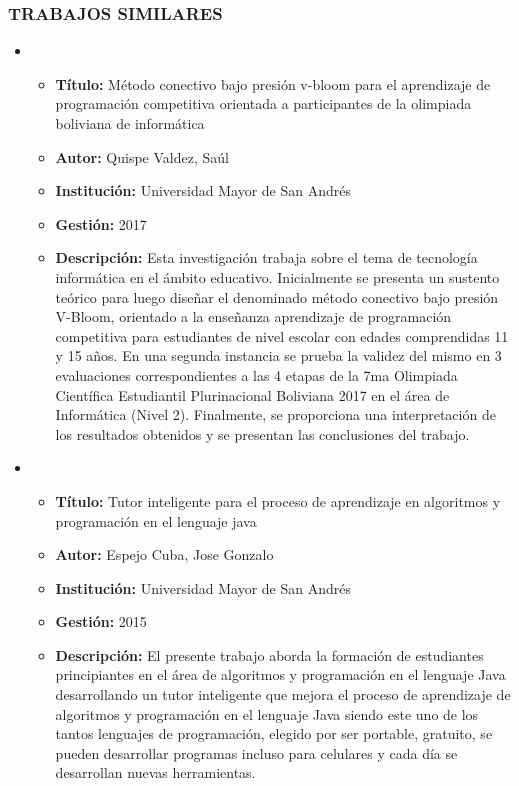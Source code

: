 \subsubsection{TRABAJOS SIMILARES}

\begin{itemize}
    \item [\textbullet]
    \begin{itemize}[nosep]
        \item[] \textbf{Título:} Método conectivo bajo presión v-bloom para el aprendizaje de programación competitiva orientada a participantes de la olimpiada boliviana de informática 
        \item[] \textbf{Autor:} Quispe Valdez, Saúl
        \item[] \textbf{Institución:} Universidad Mayor de San Andrés
        \item[] \textbf{Gestión:} 2017
        \item[] \textbf{Descripción:} Esta investigación trabaja sobre el tema de tecnología informática en el ámbito educativo. Inicialmente se presenta un sustento teórico para luego diseñar el denominado método conectivo bajo presión V-Bloom, orientado a la enseñanza aprendizaje de programación competitiva para estudiantes de nivel escolar con edades comprendidas 11 y 15 años. En una segunda instancia se prueba la validez del mismo en 3 evaluaciones correspondientes a las 4 etapas de la 7ma Olimpiada Científica Estudiantil Plurinacional Boliviana 2017 en el área de Informática (Nivel 2). Finalmente, se proporciona una interpretación de los resultados obtenidos y se presentan las conclusiones del trabajo.
    \end{itemize}

    \item [\textbullet]
    \begin{itemize}[nosep]
        \item[] \textbf{Título:} Tutor inteligente para el proceso de aprendizaje en algoritmos y programación en el lenguaje java
        \item[] \textbf{Autor:} Espejo Cuba, Jose Gonzalo
        \item[] \textbf{Institución:} Universidad Mayor de San Andrés
        \item[] \textbf{Gestión:} 2015
        \item[] \textbf{Descripción:} El presente trabajo aborda la formación de estudiantes principiantes en el área de algoritmos y programación en el lenguaje Java desarrollando un tutor inteligente que mejora el proceso de aprendizaje de algoritmos y programación en el lenguaje Java siendo este uno de los tantos lenguajes de programación, elegido por ser portable, gratuito, se pueden desarrollar programas incluso para celulares y cada día se desarrollan nuevas herramientas.
    \end{itemize}
\end{itemize}